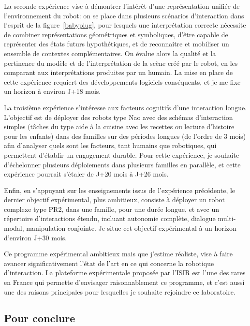 \documentclass[a4paper]{article}
\begin{document}
La seconde expérience vise à démontrer l'intérêt d'une représentation unifiée de
l'environnement du robot: on se place dans plusieurs scénarios d'interaction
dans l'esprit de la figure~\ref{babyplug}, pour lesquels une interprétation
correcte nécessite de combiner représentations géométriques et symboliques,
d'être capable de représenter des états futurs hypothétiques, et de reconnaitre
et mobiliser un ensemble de contextes complémentaires. On évalue alors la
qualité et la pertinence du modèle et de l'interprétation de la scène créé par
le robot, en les comparant aux interprétations produites par un humain. La mise
en place de cette expérience requiert des développements logiciels conséquents,
et je me fixe un horizon à environ J+18 mois.

La troisième expérience s'intéresse aux facteurs cognitifs d'une interaction
longue. L'objectif est de déployer des robots type Nao avec des schémas
d'interaction simples (tâches du type aide à la cuisine avec les recettes ou
lecture d'histoire pour les enfants) dans des familles sur des périodes longues
(de l'ordre de 3 mois) afin d'analyser quels sont les facteurs, tant humains que
robotiques, qui permettent d'établir un engagement durable. Pour cette
expérience, je souhaite d'échelonner plusieurs déploiements dans plusieurs
familles en parallèle, et cette expérience pourrait s'étaler de J+20 mois à J+26
mois.

Enfin, en s'appuyant sur les enseignements issus de l'expérience précédente, le
dernier objectif expérimental, plus ambitieux, consiste à déployer un robot
complexe type PR2, dans une famille, pour une durée longue, et avec un
répertoire d'interactions étendu, incluant autonomie complète, dialogue
multi-modal, manipulation conjointe. Je situe cet objectif expérimental à un
horizon d'environ J+30 mois.

Ce programme expérimental ambitieux mais que j'estime réaliste, vise à faire
avancer significativement l'état de l'art en ce qui concerne la robotique
d'interaction. La plateforme expérimentale proposée par l'ISIR est l'une des rares
en France qui permette d'envisager raisonnablement ce programme, et c'est aussi
une des raisons principales pour lesquelles je souhaite rejoindre ce
laboratoire.

\subsection{Pour conclure}

\printbibliography
\end{document}
